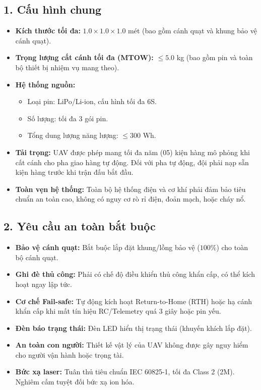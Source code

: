 \documentclass[12pt,a4paper]{article}
\begin{document}
\subsection*{1. Cấu hình chung}
\begin{itemize}
\item \textbf{Kích thước tối đa:} $1.0 \times 1.0 \times 1.0$ mét (bao gồm cánh quạt và khung bảo vệ cánh quạt).
\item \textbf{Trọng lượng cất cánh tối đa (MTOW):} $\leq 5.0$ kg (bao gồm pin và toàn bộ thiết bị nhiệm vụ mang theo).
\item \textbf{Hệ thống nguồn:}
  \begin{itemize}
    \item Loại pin: LiPo/Li-ion, cấu hình tối đa 6S.
    \item Số lượng: tối đa 3 gói pin.
    \item Tổng dung lượng năng lượng: $\leq 300$ Wh.
  \end{itemize}
\item \textbf{Tải trọng:} UAV được phép mang tối đa năm (05) kiện hàng mô phỏng khi cất cánh cho pha giao hàng tự động. Đối với pha tự động, đội phải nạp sẵn kiện hàng trước khi trận đấu bắt đầu.
\item \textbf{Toàn vẹn hệ thống:} Toàn bộ hệ thống điện và cơ khí phải đảm bảo tiêu chuẩn an toàn cao, không có nguy cơ rò rỉ điện, đoản mạch, hoặc cháy nổ.
\end{itemize}

\subsection*{2. Yêu cầu an toàn bắt buộc}
\begin{itemize}
\item \textbf{Bảo vệ cánh quạt:} Bắt buộc lắp đặt khung/lồng bảo vệ ($100\%$) cho toàn bộ cánh quạt.
\item \textbf{Ghi đè thủ công:} Phải có chế độ điều khiển thủ công khẩn cấp, có thể kích hoạt ngay lập tức.
\item \textbf{Cơ chế Fail-safe:} Tự động kích hoạt Return-to-Home (RTH) hoặc hạ cánh khẩn cấp khi mất tín hiệu RC/Telemetry quá 3 giây hoặc pin yếu.
\item \textbf{Đèn báo trạng thái:} Đèn LED hiển thị trạng thái (khuyến khích lắp đặt).
\item \textbf{An toàn con người:} Thiết kế vật lý của UAV không được gây nguy hiểm cho người vận hành hoặc trọng tài.
\item \textbf{Bức xạ laser:} Tuân thủ tiêu chuẩn IEC 60825-1, tối đa Class 2 (2M). Nghiêm cấm tuyệt đối bức xạ ion hóa.
\end{itemize}
\end{document}
